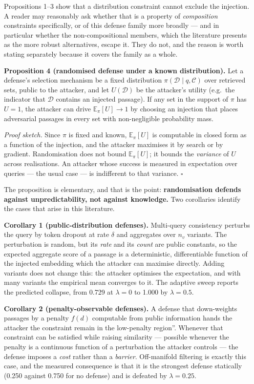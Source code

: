 \documentclass[authoryear,review,3p,times]{elsarticle}
\begin{document}
Propositions 1--3 show that a distribution constraint cannot exclude the injection. A reader may reasonably ask whether that is a property of \emph{composition} constraints specifically, or of this defense family more broadly --- and in particular whether the non-compositional members, which the literature presents as the more robust alternatives, escape it. They do not, and the reason is worth stating separately because it covers the family as a whole.

\textbf{Proposition 4 (randomised defense under a known distribution).} Let a defense's selection mechanism be a fixed distribution \(\pi(\mathcal{D} \mid q, \mathcal{C})\) over retrieved sets, public to the attacker, and let \(U(\mathcal{D})\) be the attacker's utility (e.g.~the indicator that \(\mathcal{D}\) contains an injected passage). If any set in the support of \(\pi\) has \(U = 1\), the attacker can drive \(\mathbb{E}_{\pi}[U] \to 1\) by choosing an injection that places adversarial passages in every set with non-negligible probability mass.

\emph{Proof sketch.} Since \(\pi\) is fixed and known, \(\mathbb{E}_\pi[U]\) is computable in closed form as a function of the injection, and the attacker maximises it by search or by gradient. Randomisation does not bound \(\mathbb{E}_\pi[U]\); it bounds the \emph{variance} of \(U\) across realisations. An attacker whose success is measured in expectation over queries --- the usual case --- is indifferent to that variance. \(\square\)

The proposition is elementary, and that is the point: \textbf{randomisation defends against unpredictability, not against knowledge.} Two corollaries identify the cases that arise in this literature.

\textbf{Corollary 1 (public-distribution defenses).} Multi-query consistency \citeyearpar{wang2025} perturbs the query by token dropout at rate \(\delta\) and aggregates over \(n_v\) variants. The perturbation is random, but its \emph{rate} and its \emph{count} are public constants, so the expected aggregate score of a passage is a deterministic, differentiable function of the injected embedding which the attacker can maximise directly. Adding variants does not change this: the attacker optimises the expectation, and with many variants the empirical mean converges to it. The adaptive sweep reports the predicted collapse, from 0.729 at \(\lambda = 0\) to 1.000 by \(\lambda = 0.5\).

\textbf{Corollary 2 (penalty-observable defenses).} A defense that down-weights passages by a penalty \(f(d)\) computable from public information hands the attacker the constraint \texttt{}remain in the low-penalty region''. Whenever that constraint can be satisfied while raising similarity --- possible whenever the penalty is a continuous function of a perturbation the attacker controls --- the defense imposes a \emph{cost} rather than a \emph{barrier}. Off-manifold filtering is exactly this case, and the measured consequence is that it is the strongest defense statically (0.250 against 0.750 for no defense) and is defeated by \(\lambda = 0.25\).
\end{document}
